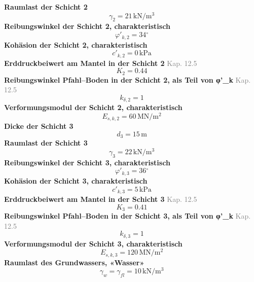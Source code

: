 \documentclass[11pt,a4paper]{article}
\newcommand{\normref}[1]{{\small\textcolor{gray}{#1}}}
\begin{document}
\noindent\textbf{Raumlast der Schicht 2}
\begin{equation*}
\gamma_{2} = 21\,\mathrm{kN}/\mathrm{m}^{3}
\end{equation*}
\noindent\textbf{Reibungswinkel der Schicht 2, charakteristisch}
\begin{equation*}
\varphi'_{k,2} = 34{}^{\circ}
\end{equation*}
\noindent\textbf{Kohäsion der Schicht 2, charakteristisch}
\begin{equation*}
c'_{k,2} = 0\,\mathrm{kPa}
\end{equation*}
\noindent\textbf{Erddruckbeiwert am Mantel in der Schicht 2} \hfill \normref{Kap. 12.5}
\begin{equation*}
K_{2} = 0.44
\end{equation*}
\noindent\textbf{Reibungswinkel Pfahl–Boden in der Schicht 2, als Teil von φ'\_k} \hfill \normref{Kap. 12.5}
\begin{equation*}
k_{\delta,2} = 1
\end{equation*}
\noindent\textbf{Verformungsmodul der Schicht 2, charakteristisch}
\begin{equation*}
E_{s,k,2} = 60\,\mathrm{MN}/\mathrm{m}^{2}
\end{equation*}
\noindent\textbf{Dicke der Schicht 3}
\begin{equation*}
d_{3} = 15\,\mathrm{m}
\end{equation*}
\noindent\textbf{Raumlast der Schicht 3}
\begin{equation*}
\gamma_{3} = 22\,\mathrm{kN}/\mathrm{m}^{3}
\end{equation*}
\noindent\textbf{Reibungswinkel der Schicht 3, charakteristisch}
\begin{equation*}
\varphi'_{k,3} = 36{}^{\circ}
\end{equation*}
\noindent\textbf{Kohäsion der Schicht 3, charakteristisch}
\begin{equation*}
c'_{k,3} = 5\,\mathrm{kPa}
\end{equation*}
\noindent\textbf{Erddruckbeiwert am Mantel in der Schicht 3} \hfill \normref{Kap. 12.5}
\begin{equation*}
K_{3} = 0.41
\end{equation*}
\noindent\textbf{Reibungswinkel Pfahl–Boden in der Schicht 3, als Teil von φ'\_k} \hfill \normref{Kap. 12.5}
\begin{equation*}
k_{\delta,3} = 1
\end{equation*}
\noindent\textbf{Verformungsmodul der Schicht 3, charakteristisch}
\begin{equation*}
E_{s,k,3} = 120\,\mathrm{MN}/\mathrm{m}^{2}
\end{equation*}
\noindent\textbf{Raumlast des Grundwassers, «Wasser»}
\begin{equation*}
\gamma_w = \gamma_{fl} = 10\,\mathrm{kN}/\mathrm{m}^{3}
\end{equation*}
\end{document}
